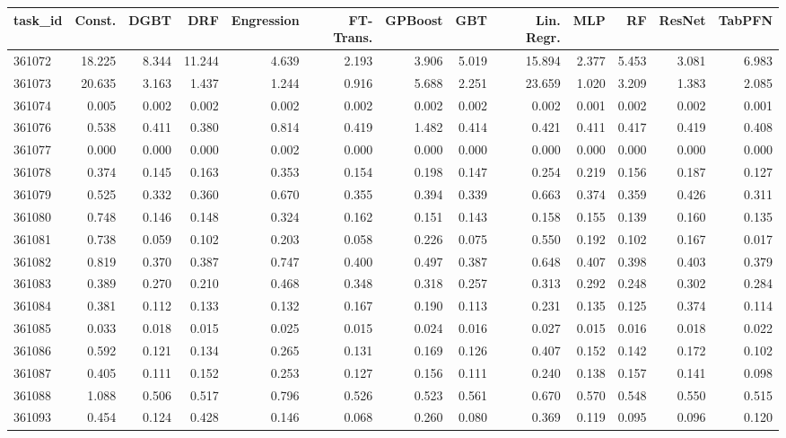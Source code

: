 \begin{tabular}{lrrrrrrrrrrrr}
\toprule
task\_id & Const. & DGBT & DRF & Engression & FT-Trans. & GPBoost & GBT & Lin. Regr. & MLP & RF & ResNet & TabPFN \\
\midrule
361072 & 18.225 & 8.344 & 11.244 & 4.639 & 2.193 & 3.906 & 5.019 & 15.894 & 2.377 & 5.453 & 3.081 & 6.983 \\
361073 & 20.635 & 3.163 & 1.437 & 1.244 & 0.916 & 5.688 & 2.251 & 23.659 & 1.020 & 3.209 & 1.383 & 2.085 \\
361074 & 0.005 & 0.002 & 0.002 & 0.002 & 0.002 & 0.002 & 0.002 & 0.002 & 0.001 & 0.002 & 0.002 & 0.001 \\
361076 & 0.538 & 0.411 & 0.380 & 0.814 & 0.419 & 1.482 & 0.414 & 0.421 & 0.411 & 0.417 & 0.419 & 0.408 \\
361077 & 0.000 & 0.000 & 0.000 & 0.002 & 0.000 & 0.000 & 0.000 & 0.000 & 0.000 & 0.000 & 0.000 & 0.000 \\
361078 & 0.374 & 0.145 & 0.163 & 0.353 & 0.154 & 0.198 & 0.147 & 0.254 & 0.219 & 0.156 & 0.187 & 0.127 \\
361079 & 0.525 & 0.332 & 0.360 & 0.670 & 0.355 & 0.394 & 0.339 & 0.663 & 0.374 & 0.359 & 0.426 & 0.311 \\
361080 & 0.748 & 0.146 & 0.148 & 0.324 & 0.162 & 0.151 & 0.143 & 0.158 & 0.155 & 0.139 & 0.160 & 0.135 \\
361081 & 0.738 & 0.059 & 0.102 & 0.203 & 0.058 & 0.226 & 0.075 & 0.550 & 0.192 & 0.102 & 0.167 & 0.017 \\
361082 & 0.819 & 0.370 & 0.387 & 0.747 & 0.400 & 0.497 & 0.387 & 0.648 & 0.407 & 0.398 & 0.403 & 0.379 \\
361083 & 0.389 & 0.270 & 0.210 & 0.468 & 0.348 & 0.318 & 0.257 & 0.313 & 0.292 & 0.248 & 0.302 & 0.284 \\
361084 & 0.381 & 0.112 & 0.133 & 0.132 & 0.167 & 0.190 & 0.113 & 0.231 & 0.135 & 0.125 & 0.374 & 0.114 \\
361085 & 0.033 & 0.018 & 0.015 & 0.025 & 0.015 & 0.024 & 0.016 & 0.027 & 0.015 & 0.016 & 0.018 & 0.022 \\
361086 & 0.592 & 0.121 & 0.134 & 0.265 & 0.131 & 0.169 & 0.126 & 0.407 & 0.152 & 0.142 & 0.172 & 0.102 \\
361087 & 0.405 & 0.111 & 0.152 & 0.253 & 0.127 & 0.156 & 0.111 & 0.240 & 0.138 & 0.157 & 0.141 & 0.098 \\
361088 & 1.088 & 0.506 & 0.517 & 0.796 & 0.526 & 0.523 & 0.561 & 0.670 & 0.570 & 0.548 & 0.550 & 0.515 \\
361093 & 0.454 & 0.124 & 0.428 & 0.146 & 0.068 & 0.260 & 0.080 & 0.369 & 0.119 & 0.095 & 0.096 & 0.120 \\

\end{tabular}

